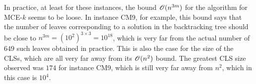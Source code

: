 In practice, at least for these instances, the bound $\mathscr{O}(n^{3m})$ for the algorithm for MCE-$k$ seems to be loose. In instance CM9, for example, this bound says that the number of leaves corresponding to a solution in the backtracking tree should be close to $n^{3m} = (10^2)^{3\times 3} = 10^{18}$, which is very far from the actual number of $649$ such leaves obtained in practice.
This is also the case for the size of the CLSs, which are all very far away from its $\mathscr{O}(n^2)$ bound. The greatest CLS size observed was $174$ for instance CM9, which is still very far away from $n^2$, which in this case is $10^4$.
\begin{table}
	\begin{center}
		\caption{Solutions of MCE-$k$ for instances CM1-CM9.}
		\label{tab:mce-results-cm}
	\end{center}
\end{table}

